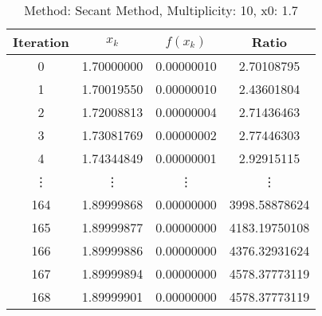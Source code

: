 \begin{table}
\centering
\caption{Method: Secant Method, Multiplicity: 10, x0: 1.7}
\label{tab:table_Secant_Method_10_1_7}
\begin{tabular}{c c c c}
\toprule
Iteration &      $x_k$ &   $f(x_k)$ &         Ratio \\
\midrule
        0 & 1.70000000 & 0.00000010 &    2.70108795 \\
        1 & 1.70019550 & 0.00000010 &    2.43601804 \\
        2 & 1.72008813 & 0.00000004 &    2.71436463 \\
        3 & 1.73081769 & 0.00000002 &    2.77446303 \\
        4 & 1.74344849 & 0.00000001 &    2.92915115 \\
   \vdots &     \vdots &     \vdots &        \vdots \\
      164 & 1.89999868 & 0.00000000 & 3998.58878624 \\
      165 & 1.89999877 & 0.00000000 & 4183.19750108 \\
      166 & 1.89999886 & 0.00000000 & 4376.32931624 \\
      167 & 1.89999894 & 0.00000000 & 4578.37773119 \\
      168 & 1.89999901 & 0.00000000 & 4578.37773119 \\
\bottomrule
\end{tabular}
\end{table}
